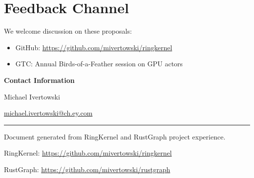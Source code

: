 \documentclass[11pt,a4paper]{article}
\begin{document}
\section{Feedback Channel}

We welcome discussion on these proposals:
\begin{itemize}[leftmargin=*]
    \item GitHub: \url{https://github.com/mivertowski/ringkernel}
    \item GTC: Annual Birds-of-a-Feather session on GPU actors
\end{itemize}

\newpage

\thispagestyle{empty}
\vspace*{\fill}
\begin{center}
    {\LARGE\bfseries Contact Information}

    \vspace{2cm}

    {\Large Michael Ivertowski}

    \vspace{0.5cm}

    {\large \href{mailto:michael.ivertowski@ch.ey.com}{michael.ivertowski@ch.ey.com}}

    \vspace{3cm}

    \hrule
    \vspace{0.5cm}
    {\small Document generated from RingKernel and RustGraph project experience.}

    {\small RingKernel: \url{https://github.com/mivertowski/ringkernel}}

    {\small RustGraph: \url{https://github.com/mivertowski/rustgraph}}
\end{center}
\vspace*{\fill}
\end{document}
